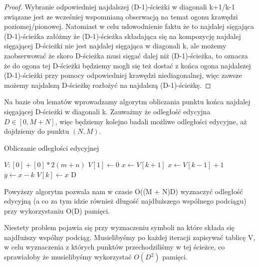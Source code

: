 \documentclass[12pt]{article}
\begin{document}
\begin{proof}
Wybranie odpowiedniej najdalszej (D-1)-ścieżki w diagonali k+1/k-1 związane jest ze wcześniej wspomnianą obserwacją na temat ogonu krawędzi poziomej/pionowej. Natomiast w celu udowodnienie faktu że to najdalej sięgająca (D-1)-ścieżka załóżmy że (D-1)-ścieżka składająca się na kompozycję najdalej sięgającej D-ścieżki nie jest najdalej sięgająca w diagonali k, ale możemy zaobserwować że skoro D-ścieżka musi sięgać dalej niż (D-1)-ścieżka, to oznacza że do ogona tej D-ścieżki będziemy mogli się też dostać z końca ogona najdalszej (D-1)-ścieżki przy pomocy odpowiedniej krawędzi niediagonalnej, więc zawsze możemy najdalszą D-ścieżkę rozłożyć na najdalszą (D-1)-ścieżkę.
\end{proof}

Na bazie obu lematów wprowadzamy algorytm obliczania punktu końca najdalej sięgającej D-ścieżki w diagonali k. Zauważmy że odległość edycyjna $D \in [0, M+N]$, więc będziemy kolejno badali możliwe odległości edycyjne, aż dojdziemy do punktu $(N,M)$.

\begin{algorithm}
\caption{Obliczanie odległości edycyjnej}
\begin{algorithmic}
\STATE $V:[0] + [0] * 2(m+n)$
\STATE $V[1] \leftarrow 0$
            \STATE $x \leftarrow V[k+1]$
        \ELSE
            \STATE $x \leftarrow V[k-1] + 1$
        \ENDIF
        \STATE $y \leftarrow x-k$
            \STATE $V[k] \leftarrow x$ 
        \ENDWHILE
            \RETURN D
        \ENDIF
    \ENDFOR
\ENDFOR
\end{algorithmic}
\end{algorithm}

\vspace{5mm}

Powyższy algorytm pozwala nam w czasie O((M + N)D) wyznaczyć odległość edycyjną (a co za tym idzie również długość najdłuższego wspólnego podciągu) przy wykorzystaniu O(D) pamięci.

Niestety problem pojawia się przy wyznaczeniu symboli na które składa się najdłuższy wspólny podciąg. Musielibyśmy po każdej iteracji zapisywać tablicę V, w celu wyznaczenia z których punktów przechodziliśmy w tej ścieżce, co sprawiałoby że musielibyśmy wykorzystać $O(D^2)$ pamięci.
\end{document}
